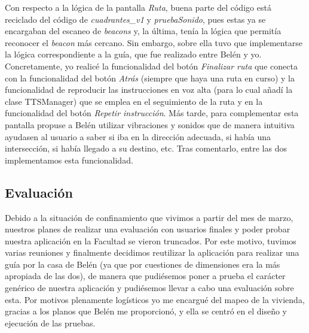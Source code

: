 Con respecto a la lógica de la pantalla \textit{Ruta}, buena parte del código está reciclado del código de \textit{cuadrantes\_v1} y \textit{pruebaSonido}, pues estas ya se encargaban del escaneo de \textit{beacons} y, la última, tenía la lógica que permitía reconocer el \textit{beacon} más cercano. Sin embargo, sobre ella tuvo que implementarse la lógica correspondiente a la guía, que fue realizado entre Belén y yo. Concretamente, yo realicé la funcionalidad del botón \textit{Finalizar ruta} que conecta con la funcionalidad del botón \textit{Atrás} (siempre que haya una ruta en curso) y la funcionalidad de reproducir las instrucciones en voz alta (para lo cual añadí la clase TTSManager) que se emplea en el seguimiento de la ruta y en la funcionalidad del botón \textit{Repetir instrucción}. Más tarde, para complementar esta pantalla propuse a Belén utilizar vibraciones y sonidos que de manera intuitiva ayudasen al usuario a saber si iba en la dirección adecuada, si había una intersección, si había llegado a su destino, etc. Tras comentarlo, entre las dos implementamos esta funcionalidad.

\subsection{Evaluación}

Debido a la situación de confinamiento que vivimos a partir del mes de marzo, nuestros planes de realizar una evaluación con usuarios finales y poder probar nuestra aplicación en la Facultad se vieron truncados. Por este motivo, tuvimos varias reuniones y finalmente decidimos reutilizar la aplicación para realizar una guía por la casa de Belén (ya que por cuestiones de dimensiones era la más apropiada de las dos), de manera que pudiésemos poner a prueba el carácter genérico de nuestra aplicación y pudiésemos llevar a cabo una evaluación sobre esta. Por motivos plenamente logísticos yo me encargué del mapeo de la vivienda, gracias a los planos que Belén me proporcionó, y ella se centró en el diseño y ejecución de las pruebas. 
